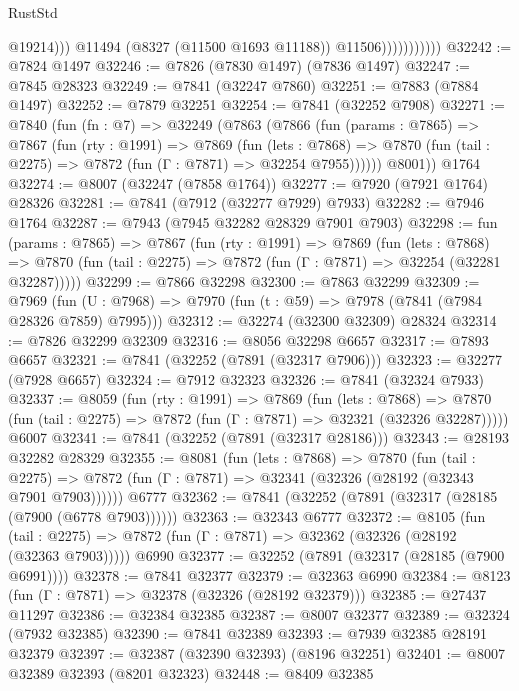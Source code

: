 \begin{lexlean}{RustStd}
\begin{coremodule}
                                @19214)))
                          @11494
                          (@8327 (@11500 @1693 @11188))
                          @11506)))))))))))
@32242 := @7824 @1497
@32246 := @7826 (@7830 @1497) (@7836 @1497)
@32247 := @7845 @28323
@32249 := @7841 (@32247 @7860)
@32251 := @7883 (@7884 @1497)
@32252 := @7879 @32251
@32254 := @7841 (@32252 @7908)
@32271 := @7840
    (fun (fn : @7) =>
    @32249
      (@7863
        (@7866
          (fun (params : @7865) =>
          @7867
            (fun (rty : @1991) =>
            @7869
              (fun (lets : @7868) =>
              @7870 (fun (tail : @2275) => @7872 (fun (Γ : @7871) => @32254 @7955))))))
        @8001))
    @1764
@32274 := @8007 (@32247 (@7858 @1764))
@32277 := @7920 (@7921 @1764) @28326
@32281 := @7841 (@7912 (@32277 @7929) @7933)
@32282 := @7946 @1764
@32287 := @7943 (@7945 @32282 @28329 @7901 @7903)
@32298 := fun (params : @7865) =>
  @7867
    (fun (rty : @1991) =>
    @7869
      (fun (lets : @7868) =>
      @7870 (fun (tail : @2275) => @7872 (fun (Γ : @7871) => @32254 (@32281 @32287)))))
@32299 := @7866 @32298
@32300 := @7863 @32299
@32309 := @7969
    (fun (U : @7968) => @7970 (fun (t : @59) => @7978 (@7841 (@7984 @28326 @7859) @7995)))
@32312 := @32274 (@32300 @32309) @28324
@32314 := @7826 @32299 @32309
@32316 := @8056 @32298 @6657
@32317 := @7893 @6657
@32321 := @7841 (@32252 (@7891 (@32317 @7906)))
@32323 := @32277 (@7928 @6657)
@32324 := @7912 @32323
@32326 := @7841 (@32324 @7933)
@32337 := @8059
    (fun (rty : @1991) =>
    @7869
      (fun (lets : @7868) =>
      @7870 (fun (tail : @2275) => @7872 (fun (Γ : @7871) => @32321 (@32326 @32287)))))
    @6007
@32341 := @7841 (@32252 (@7891 (@32317 @28186)))
@32343 := @28193 @32282 @28329
@32355 := @8081
    (fun (lets : @7868) =>
    @7870
      (fun (tail : @2275) =>
      @7872 (fun (Γ : @7871) => @32341 (@32326 (@28192 (@32343 @7901 @7903))))))
    @6777
@32362 := @7841 (@32252 (@7891 (@32317 (@28185 (@7900 (@6778 @7903))))))
@32363 := @32343 @6777
@32372 := @8105
    (fun (tail : @2275) => @7872 (fun (Γ : @7871) => @32362 (@32326 (@28192 (@32363 @7903)))))
    @6990
@32377 := @32252 (@7891 (@32317 (@28185 (@7900 @6991))))
@32378 := @7841 @32377
@32379 := @32363 @6990
@32384 := @8123 (fun (Γ : @7871) => @32378 (@32326 (@28192 @32379)))
@32385 := @27437 @11297
@32386 := @32384 @32385
@32387 := @8007 @32377
@32389 := @32324 (@7932 @32385)
@32390 := @7841 @32389
@32393 := @7939 @32385 @28191 @32379
@32397 := @32387 (@32390 @32393) (@8196 @32251)
@32401 := @8007 @32389 @32393 (@8201 @32323)
@32448 := @8409
    @32385

\end{coremodule}
\end{lexlean}
